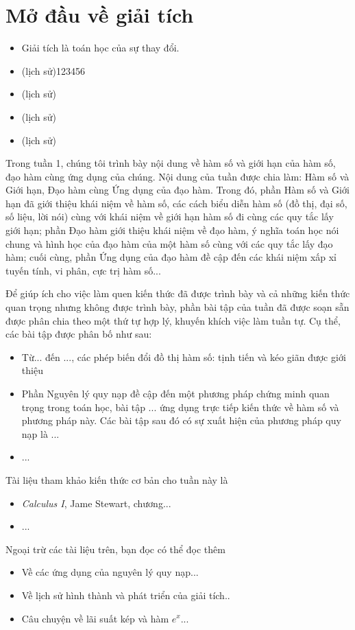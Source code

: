\documentclass[a4paper,12pt]{book}
\begin{document}
\chapter{Mở đầu về giải tích}


\begin{itemize}
    \item Giải tích là toán học của sự thay đổi.

    \item (lịch sử)123456

    \item (lịch sử)

    \item (lịch sử)
    \item (lịch sử)

\end{itemize}
\noindent Trong tuần 1, chúng tôi trình bày nội dung về hàm số và giới hạn của hàm số, đạo hàm cùng ứng dụng của chúng.
\newpage
Nội dung của tuần được chia làm: Hàm số và Giới hạn, Đạo hàm cùng Ứng dụng của đạo hàm. Trong đó, phần Hàm số và Giới hạn đã giới thiệu khái niệm về hàm số, các cách biểu diễn hàm số (đồ thị, đại số, số liệu, lời nói) cùng với khái niệm về giới hạn hàm số đi cùng các quy tắc lấy giới hạn; phần Đạo hàm giới thiệu khái niệm về đạo hàm, ý nghĩa toán học nói chung và hình học của đạo hàm của một hàm số cùng với các quy tắc lấy đạo hàm; cuối cùng, phần Ứng dụng của đạo hàm đề cập đến các khái niệm xấp xỉ tuyến tính, vi phân, cực trị hàm số...

\vspace{5mm}
Để giúp ích cho việc làm quen kiến thức đã được trình bày và cả những kiến thức quan trọng nhưng không được trình bày, phần bài tập của tuần đã được soạn sẵn được phân chia theo một thứ tự hợp lý, khuyến khích việc làm tuần tự. Cụ thể, các bài tập được phân bố như sau:
\begin{itemize}
    \item Từ... đến ..., các phép biến đổi đồ thị hàm số: tịnh tiến và kéo giãn được giới thiệu
    \item Phần Nguyên lý quy nạp đề cập đến một phương pháp chứng minh quan trọng trong toán học, bài tập ... ứng dụng trực tiếp kiến thức về hàm số và phương pháp này. Các bài tập sau đó có sự xuất hiện của phương pháp quy nạp là ...
    \item ...
\end{itemize}
Tài liệu tham khảo kiến thức cơ bản cho tuần này là
\begin{itemize}
    \item \emph{Calculus I}, Jame Stewart, chương...
    \item ...
\end{itemize}
Ngoại trừ các tài liệu trên, bạn đọc có thể đọc thêm 
\begin{itemize}
    \item Về các ứng dụng của nguyên lý quy nạp...
    \item Về lịch sử hình thành và phát triển của giải tích..
    \item Câu chuyện về lãi suất kép và hàm $e^x$...
\end{itemize}
\end{document}
